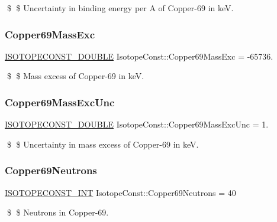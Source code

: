 \$ \$ Uncertainty in binding energy per A of Copper-\/69 in keV. \mbox{\label{group___isotope_const-_copper-_cu69_ga139da293bbdbdfacbb24df32c00e97d7}} 
\subsubsection{\texorpdfstring{Copper69\+Mass\+Exc}{Copper69MassExc}}
{\footnotesize\ttfamily \mbox{\hyperlink{group___isotope_const-_macros_ga8f45a7272ce02c0b4c65c44636ed719a}{I\+S\+O\+T\+O\+P\+E\+C\+O\+N\+S\+T\+\_\+\+D\+O\+U\+B\+LE}} Isotope\+Const\+::\+Copper69\+Mass\+Exc = -\/65736.}

\$ \$ Mass excess of Copper-\/69 in keV. \mbox{\label{group___isotope_const-_copper-_cu69_gabd232e564a847d7067df6580bdf8ac2b}} 
\subsubsection{\texorpdfstring{Copper69\+Mass\+Exc\+Unc}{Copper69MassExcUnc}}
{\footnotesize\ttfamily \mbox{\hyperlink{group___isotope_const-_macros_ga8f45a7272ce02c0b4c65c44636ed719a}{I\+S\+O\+T\+O\+P\+E\+C\+O\+N\+S\+T\+\_\+\+D\+O\+U\+B\+LE}} Isotope\+Const\+::\+Copper69\+Mass\+Exc\+Unc = 1.}

\$ \$ Uncertainty in mass excess of Copper-\/69 in keV. \mbox{\label{group___isotope_const-_copper-_cu69_ga874f5883b8ee183f207cbcc22a4063c0}} 
\subsubsection{\texorpdfstring{Copper69\+Neutrons}{Copper69Neutrons}}
{\footnotesize\ttfamily \mbox{\hyperlink{group___isotope_const-_macros_ga5f18360b3e99483a35c32d789e62621c}{I\+S\+O\+T\+O\+P\+E\+C\+O\+N\+S\+T\+\_\+\+I\+NT}} Isotope\+Const\+::\+Copper69\+Neutrons = 40}

\$ \$ Neutrons in Copper-\/69. \mbox{\label{group___isotope_const-_copper-_cu69_ga605255d83e53d2d1a7f7affdf1dc7ec3}} 
